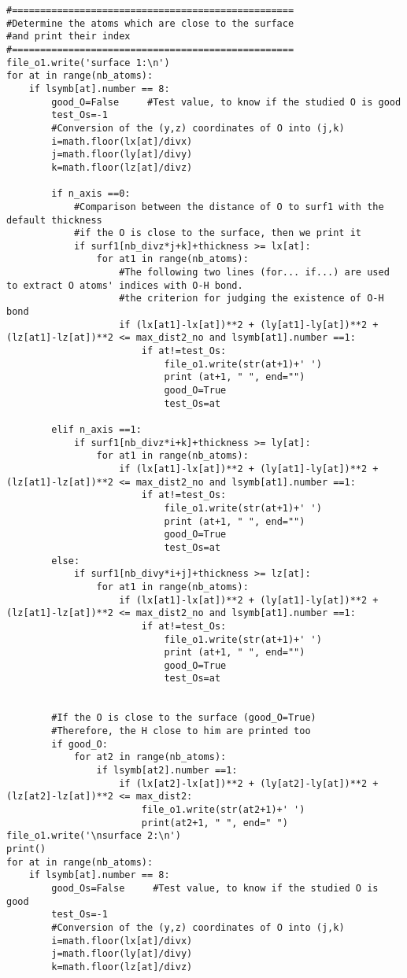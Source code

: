 \begin{lstlisting}
#==================================================
#Determine the atoms which are close to the surface
#and print their index
#==================================================
file_o1.write('surface 1:\n')
for at in range(nb_atoms):
	if lsymb[at].number == 8:
		good_O=False     #Test value, to know if the studied O is good 
		test_Os=-1
		#Conversion of the (y,z) coordinates of O into (j,k)
		i=math.floor(lx[at]/divx)
		j=math.floor(ly[at]/divy)
		k=math.floor(lz[at]/divz)

		if n_axis ==0:
			#Comparison between the distance of O to surf1 with the default thickness
			#if the O is close to the surface, then we print it
			if surf1[nb_divz*j+k]+thickness >= lx[at]:
				for at1 in range(nb_atoms): 
					#The following two lines (for... if...) are used to extract O atoms' indices with O-H bond.
					#the criterion for judging the existence of O-H bond
					if (lx[at1]-lx[at])**2 + (ly[at1]-ly[at])**2 +(lz[at1]-lz[at])**2 <= max_dist2_no and lsymb[at1].number ==1:
						if at!=test_Os:
							file_o1.write(str(at+1)+' ')
							print (at+1, " ", end="")
							good_O=True
							test_Os=at

		elif n_axis ==1:
			if surf1[nb_divz*i+k]+thickness >= ly[at]:
				for at1 in range(nb_atoms):
					if (lx[at1]-lx[at])**2 + (ly[at1]-ly[at])**2 +(lz[at1]-lz[at])**2 <= max_dist2_no and lsymb[at1].number ==1:
						if at!=test_Os:
							file_o1.write(str(at+1)+' ')
							print (at+1, " ", end="")
							good_O=True
							test_Os=at
		else:
			if surf1[nb_divy*i+j]+thickness >= lz[at]:
				for at1 in range(nb_atoms):
					if (lx[at1]-lx[at])**2 + (ly[at1]-ly[at])**2 +(lz[at1]-lz[at])**2 <= max_dist2_no and lsymb[at1].number ==1:
						if at!=test_Os:
							file_o1.write(str(at+1)+' ')
							print (at+1, " ", end="")
							good_O=True
							test_Os=at


		#If the O is close to the surface (good_O=True)
		#Therefore, the H close to him are printed too             
		if good_O:
			for at2 in range(nb_atoms):                                    
				if lsymb[at2].number ==1: 
					if (lx[at2]-lx[at])**2 + (ly[at2]-ly[at])**2 +(lz[at2]-lz[at])**2 <= max_dist2:                                                                
						file_o1.write(str(at2+1)+' ')
						print(at2+1, " ", end=" ")
file_o1.write('\nsurface 2:\n')
print()
for at in range(nb_atoms):
	if lsymb[at].number == 8:
		good_Os=False     #Test value, to know if the studied O is good 
		test_Os=-1
		#Conversion of the (y,z) coordinates of O into (j,k)
		i=math.floor(lx[at]/divx)
		j=math.floor(ly[at]/divy)
		k=math.floor(lz[at]/divz)


\end{lstlisting}
